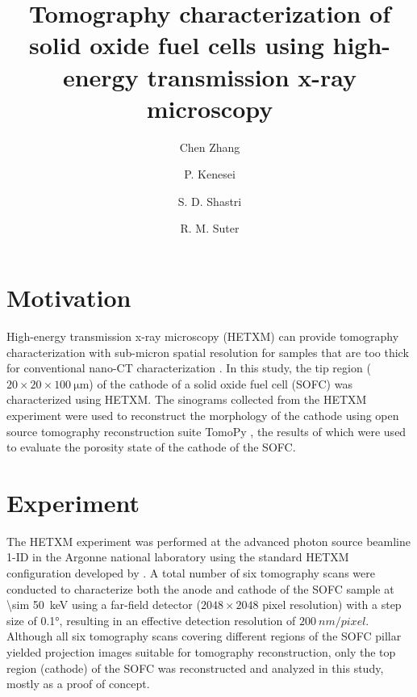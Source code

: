 \documentclass[12pt]{scrartcl}
\begin{document}
\title{
Tomography characterization of solid oxide fuel cells using high-energy transmission x-ray microscopy}
\author[a]{Chen Zhang}
\author[b]{P. Kenesei}
\author[b]{S. D. Shastri}
\author[a]{R. M. Suter}


\maketitle

\section{Motivation}\label{sec: motivation}

High-energy transmission x-ray microscopy (HETXM) can provide tomography characterization with sub-micron spatial resolution for samples that are too thick for conventional nano-CT characterization \citep{Shastri_etal2015}.
In this study, the tip region ($20\times20\times\SI{100}{\micro\meter}$) of the cathode of a solid oxide fuel cell (SOFC) was characterized using HETXM.
The sinograms collected from the HETXM experiment were used to reconstruct the morphology of the cathode using open source tomography reconstruction suite TomoPy \citep{Gursoy_etal2014}, the results of which were used to evaluate the porosity state of the cathode of the SOFC. 


\section{Experiment}\label{sec: exp}

The HETXM experiment was performed at the advanced photon source beamline 1-ID in the Argonne national laboratory using the standard HETXM configuration developed by \citet{Shastri_etal2015}.
A total number of six tomography scans were conducted to characterize both the anode and cathode of the SOFC sample at \SI{\sim 50}{keV} using a far-field detector ($2048\times2048$ pixel resolution) with a step size of \ang{0.1}, resulting in an effective detection resolution of $\SI{200}{nm/pixel}$.
Although all six tomography scans covering different regions of the SOFC pillar yielded projection images suitable for tomography reconstruction, only the top region (cathode) of the SOFC was reconstructed and analyzed in this study, mostly as a proof of concept.
\end{document}
